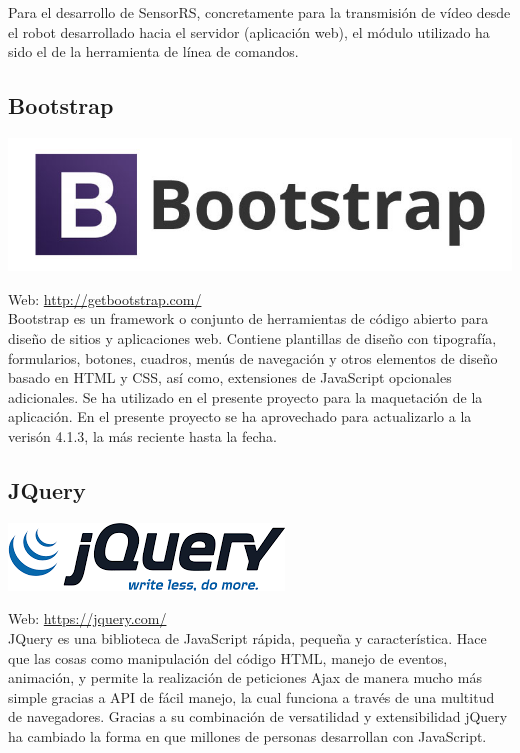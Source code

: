 Para el desarrollo de SensorRS, concretamente para la transmisión de vídeo desde el robot desarrollado hacia el servidor (aplicación web), el módulo utilizado ha sido el de la herramienta de línea de comandos.


\subsection{Bootstrap}


\begin{center}
\includegraphics[scale=0.3]{imagenes/bootstrap-logo.jpg}
\end{center}

Web: \url{http://getbootstrap.com/}\\

Bootstrap es un framework o conjunto de herramientas de código abierto para diseño de sitios y aplicaciones web. Contiene plantillas de diseño con tipografía, formularios, botones, cuadros, menús de navegación y otros elementos de diseño basado en HTML y CSS, así como, extensiones de JavaScript opcionales adicionales.
Se ha utilizado en el presente proyecto para la maquetación de la aplicación. En el presente proyecto se ha aprovechado para actualizarlo a la verisón 4.1.3, la más reciente hasta la fecha.\\  

\subsection{JQuery}


\begin{center}
\includegraphics[scale=0.7]{imagenes/jquery-logo.png}
\end{center}

Web: \url{https://jquery.com/}\\

JQuery es una biblioteca de JavaScript rápida, pequeña y característica. Hace que las cosas como manipulación del código HTML, manejo de eventos, animación, y permite la realización de 
peticiones Ajax de manera mucho más simple gracias a API de fácil manejo, la cual funciona a través de una multitud de navegadores. Gracias a su combinación de versatilidad y extensibilidad jQuery
ha cambiado la forma en que millones de personas desarrollan con JavaScript.\\



